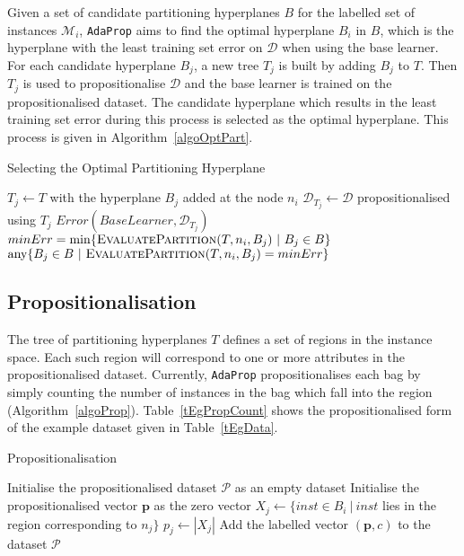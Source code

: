 \documentclass[a4paper,12pt]{article} %
\newcommand{\AdaProp}{\texttt{AdaProp}\xspace}
\newcommand{\mcl}[1]{\mathcal{#1}}
\newcommand{\vect}[1]{\boldsymbol{#1}}
\begin{document}
Given a set of candidate partitioning hyperplanes $B$ for the labelled set of instances $\mcl{M}_i$, 
    \AdaProp aims to find the optimal hyperplane $B_i$ in $B$, 
    which is the hyperplane with the least
    training set error on $\mcl{D}$ when using the base learner.
For each candidate hyperplane $B_j$,
    a new tree $T_j$ is built by adding $B_j$ to $T$.
Then $T_j$ is used to propositionalise $\mcl{D}$
    and the base learner is trained on the propositionalised dataset.
The candidate hyperplane which results in the least training set 
    error during this process is selected as the 
    optimal hyperplane.
This process is given in Algorithm~\ref{algoOptPart}.

\begin{algorithm}
\caption{Selecting the Optimal Partitioning Hyperplane}
\label{algoOptPart} 
\begin{algorithmic}
    \State $T_j \gets T$ with the hyperplane $B_j$ added at the node $n_i$
        \State $\mcl{D}_{T_j} \gets \mcl{D}$ propositionalised using $T_j$
        \State \Return $Error(BaseLearner,\mcl{D}_{T_j})$
    \EndFunction
    \State 
    \State $minErr = \min \{ \textrm{\sc EvaluatePartition}(T,n_i,B_j) ~|~ B_j \in B \}$
    \State \Return $\textrm{any} \{ B_j \in B ~|~ \textrm{\sc EvaluatePartition}(T,n_i,B_j) = minErr \}$
    \EndFunction
\end{algorithmic}
\end{algorithm}

\subsection{Propositionalisation}
\label{secProp}

The tree of partitioning hyperplanes $T$ defines a set of regions in the instance space.
Each such region will correspond to one or more attributes 
    in the propositionalised dataset.
Currently, \AdaProp propositionalises each bag 
    by simply counting the number of instances in the bag which fall into the region
    (Algorithm~\ref{algoProp}).
Table~\ref{tEgPropCount} shows the propositionalised form of 
    the example dataset given in Table~\ref{tEgData}.

\begin{algorithm}
\caption{Propositionalisation}
\label{algoProp} 
    \begin{algorithmic}
    \State Initialise the propositionalised dataset $\mcl{P}$ as an empty dataset
    \ForAll{bags $(B_i,c) \in \mcl{D}$}
        \State Initialise the propositionalised vector $\vect{p}$ as the zero vector
            \State $X_j \gets \{ inst \in B_i ~|~ inst$ 
                lies in the region corresponding to $n_j \} $
            \State $p_{j} \gets | X_j |$
        \EndFor
        \State Add the labelled vector $(\vect{p},c)$ 
            to the dataset $\mcl{P}$
    \EndFor
    \end{algorithmic}
\end{algorithm}
    
\end{document}
